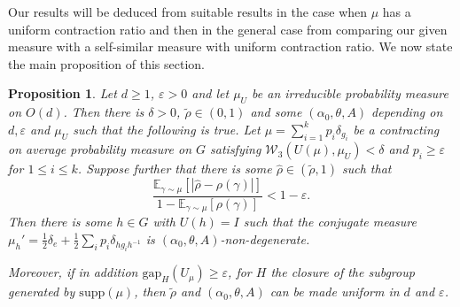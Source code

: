 \documentclass[10pt, english,oneside,reqno]{amsart}
\theoremstyle{plain}
\newtheorem{proposition}[theorem]{Proposition}
\theoremstyle{remark}
\numberwithin{equation}{section}
\numberwithin{figure}{section}
\newcommand{\eps}{\varepsilon}
\newcommand{\R}{\mathbb{R}}
\newcommand{\supp}[1]{\mathrm{supp}(#1)}
\begin{document}
Our results will be deduced from suitable results in the case when $\mu$ has a uniform contraction ratio and then in the general case from comparing our given measure with a self-similar measure with uniform contraction ratio. We now state the main proposition of this section.

\begin{proposition} \label{prop:non_degen}
    Let $d\geq 1$, $\eps > 0$ and let $\mu_U$ be an irreducible probability measure on $O(d)$. Then there is  $\delta > 0$, $\tilde{\rho} \in (0,1)$ and some $(\alpha_0,\theta, A)$ depending on $d, \eps$ and $\mu_U$ such that the following is true. Let $\mu = \sum_{i = 1}^k p_i \delta_{g_i}$ be a contracting on average probability measure on $G$ satisfying  $\mathcal{W}_3(U(\mu), \mu_U) < \delta$ and $p_i \geq \eps$ for $1 \leq i \leq k$. Suppose further that there is some $\hat{\rho} \in (\tilde{\rho},1)$ such that $$\frac{\mathbb{E}_{\gamma \sim \mu} [|\hat{\rho} - \rho(\gamma) |]}{1 - \mathbb{E}_{\gamma \sim \mu}[\rho(\gamma)]} < 1 - \varepsilon.$$
    Then there is some $h \in G$ with $U(h) = I$ such that the conjugate measure $\mu_h' = \frac{1}{2}\delta_e + \frac{1}{2}\sum_i p_i \delta_{hg_ih^{-1}}$  is $(\alpha_0, \theta, A)$-non-degenerate.

    Moreover, if in addition $\mathrm{gap}_{H}(U_\mu) \geq \eps$, for $H$ the closure of the subgroup generated by $\supp \mu$, then $\tilde{\rho}$ and $(\alpha_0,\theta,A)$ can be made uniform in $d$ and $\eps$.
\end{proposition}

\end{document}
